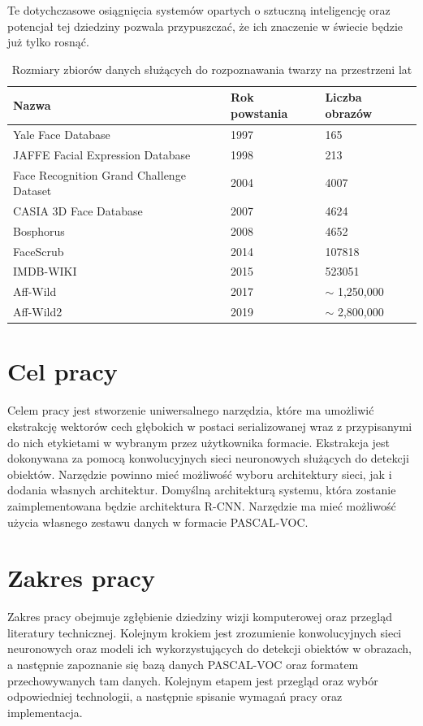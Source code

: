 \documentclass[a4paper,twoside,12pt]{book}
\begin{document}
{Te dotychczasowe osiągnięcia systemów opartych o sztuczną inteligencję oraz potencjał tej dziedziny pozwala przypuszczać, że ich znaczenie w świecie będzie już tylko rosnąć. }
 





\begin{table}
\centering
\caption{Rozmiary zbiorów danych służących do rozpoznawania twarzy na przestrzeni lat}
\begin{tabular}{lll}
\hline
Nazwa & Rok powstania & Liczba obrazów \\
\hline
Yale Face Database\cite{Yale} & 1997 & 165 \\
JAFFE Facial Expression Database\cite{lyons1998coding}  & 1998 &  213 \\
Face Recognition Grand Challenge Dataset\cite{bowyer2006survey} & 2004 & 4007 \\
CASIA 3D Face Database\cite{Cas} & 2007 & 4624 \\
Bosphorus\cite{savran2008bosphorus} &2008& 4652 \\
FaceScrub\cite{ng2014data} & 2014 & 107818 \\
IMDB-WIKI\cite{Rothe-ICCVW-2015} & 2015 & 523051 \\
Aff-Wild \cite{zafeiriou2017aff} & 2017 & $\sim$ 1,250,000 \\
Aff-Wild2 \cite{kollias2019expression} & 2019 &$\sim$ 2,800,000 \\
\hline
\end{tabular}

\label{tab:datasets}
\end{table}  

\section{Cel pracy}
{Celem pracy jest stworzenie uniwersalnego narzędzia, które ma umożliwić ekstrakcję wektorów cech głębokich w postaci serializowanej wraz z przypisanymi do nich etykietami w wybranym przez użytkownika formacie. Ekstrakcja jest dokonywana za pomocą konwolucyjnych sieci neuronowych służących do detekcji obiektów. Narzędzie powinno mieć możliwość wyboru architektury sieci, jak i dodania własnych architektur. Domyślną architekturą systemu, która zostanie zaimplementowana będzie architektura R-CNN. Narzędzie ma mieć możliwość użycia własnego zestawu danych w formacie PASCAL-VOC.}
\section{Zakres pracy}
{Zakres pracy obejmuje zgłębienie dziedziny wizji komputerowej oraz przegląd literatury technicznej. Kolejnym krokiem jest zrozumienie konwolucyjnych sieci neuronowych oraz modeli ich wykorzystujących do detekcji obiektów w obrazach, a następnie zapoznanie się bazą danych PASCAL-VOC oraz formatem przechowywanych tam danych. Kolejnym etapem jest przegląd oraz wybór odpowiedniej technologii, a następnie spisanie wymagań pracy oraz implementacja. }
\end{document}
